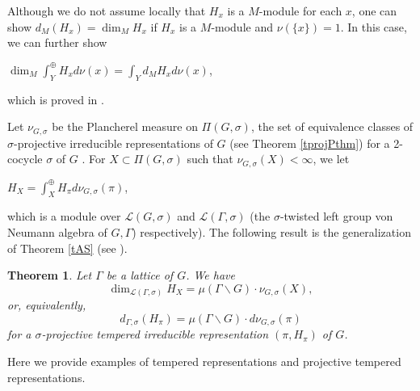 \documentclass[11pt]{article}
\theoremstyle{plain}
\newtheorem{theorem}{Theorem}[section]
\theoremstyle{remark}
\theoremstyle{definition}
\begin{document}
Although we do not assume locally that $H_{x}$ is a $M$-module for each $x$, one can show 
$d_{M}(H_x)=\dim_M H_x$ if $H_x$ is a $M$-module and $\nu(\{x\})=1$. 
In this case, we can further show
\begin{center}  $\dim_{M}\int_{Y}^{\oplus}H_{x}d\nu(x)=\int_{Y}d_{M}H_{x}d\nu(x)$, 
\end{center}
which is proved in \cite[Proposition 2.1]{Y25AS}. 

Let $\nu_{G,\sigma}$ be the Plancherel measure on $\Pi(G,\sigma)$, the set of equivalence classes of $\sigma$-projective irreducible representations of $G$ (see Theorem \ref{tprojPthm}) for a 2-cocycle $\sigma$ of $G$ . 
For $X\subset\Pi(G,\sigma)$ such that $\nu_{G,\sigma}(X)<\infty$, we let
\begin{center}
    $H_X=\int_X^{\oplus} H_{\pi}d\nu_{G,\sigma}(\pi)$,
\end{center}
which is a module over $\mathcal{L}(G,\sigma)$ and $\mathcal{L}(\Gamma,\sigma)$ (the $\sigma$-twisted left group von Neumann algebra of $G,\Gamma$) respectively). 
The following result is the generalization of Theorem \ref{tAS} (see \cite[Theorem 3.5]{Y25AS}). 

\begin{theorem}\label{tdimmeas}
Let $\Gamma$ be a lattice of $G$.   
We have 
\begin{equation}\label{eASf1}
   \dim_{\mathcal{L}(\Gamma,\sigma)}H_X=\mu(\Gamma\backslash G)\cdot \nu_{G,\sigma}(X),
\end{equation}
or, equivalently, 
\begin{equation}\label{eASf1a}
  d_{\Gamma,\sigma}(H_{\pi})=\mu(\Gamma\backslash G)\cdot d\nu_{G,\sigma}(\pi)
\end{equation}
for a $\sigma$-projective tempered irreducible representation $(\pi,H_{\pi})$ of $G$. 
\end{theorem}

Here we provide examples of tempered representations and projective tempered representations. %
\end{document}
